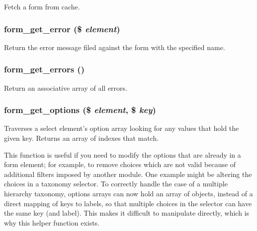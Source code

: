 Fetch a form from cache. \hypertarget{group__form__api_ge57581ad2406d61116a133b99142283b}{
\subsubsection[{form\_\-get\_\-error}]{\setlength{\rightskip}{0pt plus 5cm}form\_\-get\_\-error (\$ {\em element})}}
\label{group__form__api_ge57581ad2406d61116a133b99142283b}


Return the error message filed against the form with the specified name. \hypertarget{group__form__api_g158b3db5e88e96bf060c524cebcb8130}{
\subsubsection[{form\_\-get\_\-errors}]{\setlength{\rightskip}{0pt plus 5cm}form\_\-get\_\-errors ()}}
\label{group__form__api_g158b3db5e88e96bf060c524cebcb8130}


Return an associative array of all errors. \hypertarget{group__form__api_g88bf27e1f6246789acc77dd1686e0276}{
\subsubsection[{form\_\-get\_\-options}]{\setlength{\rightskip}{0pt plus 5cm}form\_\-get\_\-options (\$ {\em element}, \/  \$ {\em key})}}
\label{group__form__api_g88bf27e1f6246789acc77dd1686e0276}


Traverses a select element's option array looking for any values that hold the given key. Returns an array of indexes that match.

This function is useful if you need to modify the options that are already in a form element; for example, to remove choices which are not valid because of additional filters imposed by another module. One example might be altering the choices in a taxonomy selector. To correctly handle the case of a multiple hierarchy taxonomy, options arrays can now hold an array of objects, instead of a direct mapping of keys to labels, so that multiple choices in the selector can have the same key (and label). This makes it difficult to manipulate directly, which is why this helper function exists.

